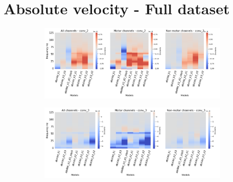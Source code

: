 \clearpage
\section*{Absolute velocity - Full dataset}\label{sec:absolute-velocity-appendixB}

\begin{figure}[!htpb]
\centering
\begin{subfigure}[b]{\textwidth}
   \includegraphics[width=1\linewidth]{img/appendix/A/conv-2/sm/absVel-model-gradients-all_kinds}
   \caption{}
   \label{fig:absVel-shifted-grads-conv-2}
\end{subfigure}

\begin{subfigure}[b]{\textwidth}
   \includegraphics[width=1\linewidth]{img/appendix/A/conv-3/sm/absVel-model-gradients-all_kinds}
   \caption{}
   \label{fig:absVel-shifted-grads-conv-3}
\end{subfigure}
\end{figure}
\clearpage   


